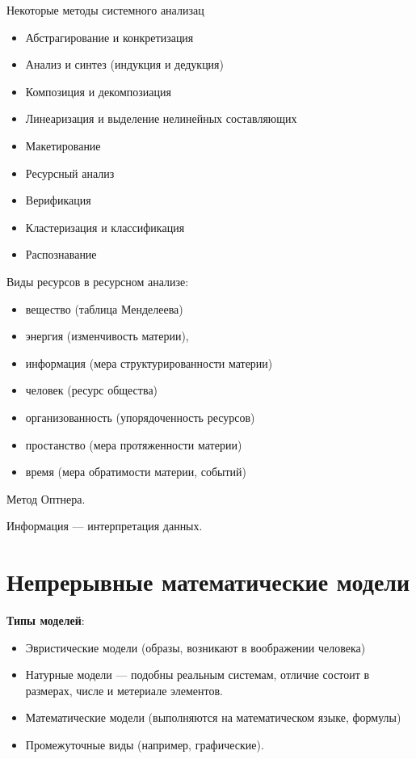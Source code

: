 Некоторые методы системного анализац
\begin{itemize}
    \item Абстрагирование и конкретизация

    \item Анализ и синтез (индукция и дедукция)

    \item Композиция и декомпозиация

    \item Линеаризация и выделение нелинейных составляющих

    \item Макетирование

    \item Ресурсный анализ

    \item Верификация

    \item Кластеризация и классификация

    \item Распознавание
\end{itemize}

Виды ресурсов в ресурсном анализе:
\begin{itemize}
    \item вещество (таблица Менделеева)
    \item энергия (изменчивость материи),
    \item информация (мера структурированности материи)
    \item человек (ресурс общества)
    \item организованность (упорядоченность ресурсов)
    \item простанство (мера протяженности материи)
    \item время (мера обратимости материи, событий)
\end{itemize}

Метод Оптнера.

Информация --- интерпретация данных.

\section{Непрерывные математические модели}

\textbf{Типы моделей}:
\begin{itemize}
    \item Эвристические модели (образы, возникают в воображении человека)

    \item Натурные модели --- подобны реальным системам, отличие состоит в
        размерах, числе и метериале элементов.

    \item Математические модели (выполняются на математическом языке, формулы)

    \item Промежуточные виды (например, графические).
\end{itemize}

